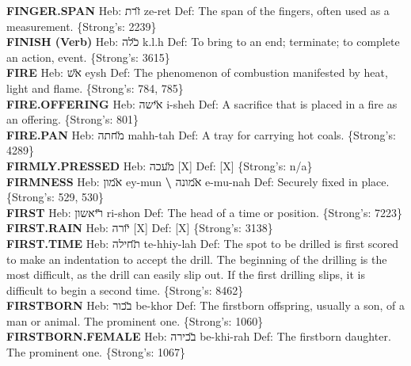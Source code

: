 {\textbf{FINGER.SPAN} Heb: {\large\H זרת} ze-ret Def: The span of the fingers, often used as a measurement. \{Strong's: 2239\}\hfill{}\\

\textbf{FINISH (Verb)} Heb: {\large\H כלה} k.l.h Def: To bring to an end; terminate; to complete an action, event. \{Strong's: 3615\}\hfill{}\\

\textbf{FIRE} Heb: {\large\H אש} eysh Def: The phenomenon of combustion manifested by heat, light and flame. \{Strong's: 784, 785\}\hfill{}\\

\textbf{FIRE.OFFERING} Heb: {\large\H אישה} i-sheh Def: A sacrifice that is placed in a fire as an offering. \{Strong's: 801\}\hfill{}\\

\textbf{FIRE.PAN} Heb: {\large\H מחתה} mahh-tah Def: A tray for carrying hot coals. \{Strong's: 4289\}\hfill{}\\

\textbf{FIRMLY.PRESSED} Heb: {\large\H מעכה} {[}X{]} Def: {[}X{]} \{Strong's: n/a\}\hfill{}\\

\textbf{FIRMNESS} Heb: {\large\H אמון} ey-mun \textbf{\textbackslash{}} {\large\H אמונה} e-mu-nah Def: Securely fixed in place. \{Strong's: 529, 530\}\hfill{}\\

\textbf{FIRST} Heb: {\large\H ריאשון} ri-shon Def: The head of a time or position. \{Strong's: 7223\}\hfill{}\\

\textbf{FIRST.RAIN} Heb: {\large\H יורה} {[}X{]} Def: {[}X{]} \{Strong's: 3138\}\hfill{}\\

\textbf{FIRST.TIME} Heb: {\large\H תחילה} te-hhiy-lah Def: The spot to be drilled is first scored to make an indentation to accept the drill. The beginning of the drilling is the most difficult, as the drill can easily slip out. If the first drilling slips, it is difficult to begin a second time. \{Strong's: 8462\}\hfill{}\\

\textbf{FIRSTBORN} Heb: {\large\H בכור} be-khor Def: The firstborn offspring, usually a son, of a man or animal. The prominent one. \{Strong's: 1060\}\hfill{}\\

\textbf{FIRSTBORN.FEMALE} Heb: {\large\H בכירה} be-khi-rah Def: The firstborn daughter. The prominent one. \{Strong's: 1067\}\hfill{}\\

}
